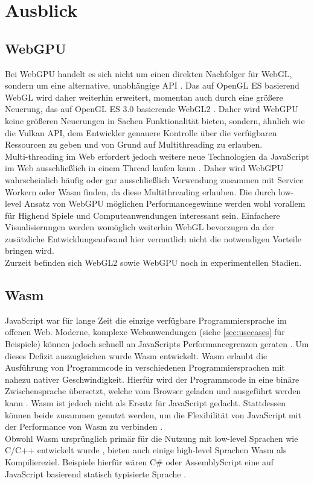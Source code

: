 \section{Ausblick}
\subsection{WebGPU}
Bei WebGPU handelt es sich nicht um einen direkten Nachfolger für WebGL, sondern um eine alternative, unabhängige API \cite{WebGPUIntro}. Das auf OpenGL ES basierend WebGL wird daher weiterhin erweitert, momentan auch durch eine größere Neuerung, das auf OpenGL ES 3.0 basierende WebGL2 \cite{WebGL2}. Daher wird WebGPU keine größeren Neuerungen in Sachen Funktionalität bieten, sondern, ähnlich wie die Vulkan API, dem Entwickler genauere Kontrolle über die verfügbaren Ressourcen zu geben und von Grund auf Multithreading zu erlauben. \\
Multi-threading im Web erfordert jedoch weitere neue Technologien da JavaScript im Web ausschließlich in einem Thread laufen kann \cite{JSConcurrency}. Daher wird WebGPU wahrscheinlich häufig oder gar ausschließlich Verwendung zusammen mit Service Workern oder \ac{Wasm} finden, da diese Multithreading erlauben.
Die durch low-level Ansatz von WebGPU möglichen Performancegewinne werden wohl vorallem für Highend Spiele und Computeanwendungen interessant sein. Einfachere Visualisierungen werden womöglich weiterhin WebGL bevorzugen da der zusätzliche Entwicklungsaufwand hier vermutlich nicht die notwendigen Vorteile bringen wird. \\
Zurzeit befinden sich WebGL2 sowie WebGPU noch in experimentellen Stadien.
\subsection{\acf{Wasm}}
JavaScript war für lange Zeit die einzige verfügbare Programmiersprache im offenen Web. Moderne, komplexe Webanwendungen (siehe \ref{sec:usecases} für Beispiele) können jedoch schnell an JavaScripts Performancegrenzen geraten \cite{haas2017bringing}. Um dieses Defizit auszugleichen wurde \ac{Wasm} entwickelt. \ac{Wasm} erlaubt die Ausführung von Programmcode in verschiedenen Programmiersprachen mit nahezu nativer Geschwindigkeit. Hierfür wird der Programmcode in eine binäre Zwischensprache übersetzt, welche vom Browser geladen und ausgeführt werden kann \cite{WasmMDN}. \ac{Wasm} ist jedoch nicht als Ersatz für JavaScript gedacht. Stattdessen können beide zusammen genutzt werden, um die Flexibilität von JavaScript mit der Performance von \ac{Wasm} zu verbinden \cite{WasmMDN}. \\
Obwohl \ac{Wasm} ursprünglich primär für die Nutzung mit low-level Sprachen wie C/C++ entwickelt wurde \cite{WasmMDN}, bieten auch einige high-level Sprachen \ac{Wasm} als Kompiliereziel. Beispiele hierfür wären C\# \cite{dotnetWASM} oder AssemblyScript eine auf JavaScript basierend statisch typisierte Sprache \cite{AsmScript}.

